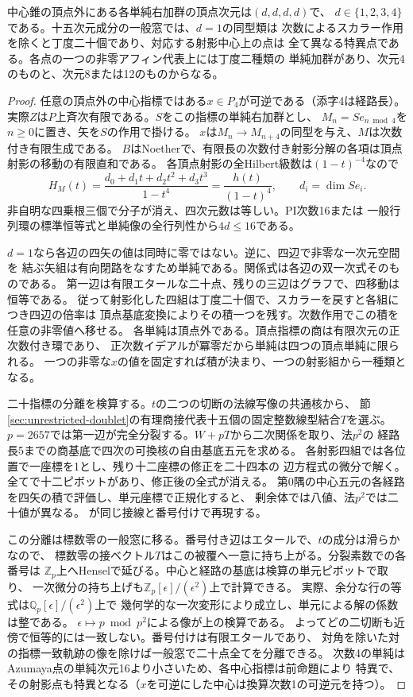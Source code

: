 \begin{theorem}\label{thm:twenty-minimal-characters}
中心錐の頂点外にある各単純右加群の頂点次元は$(d,d,d,d)$で、
$d\in\{1,2,3,4\}$である。十五次元成分の一般窓では、$d=1$の同型類は
次数によるスカラー作用を除くと丁度二十個であり、対応する射影中心上の点は
全て異なる特異点である。各点の一つの非零アフィン代表上には丁度二種類の
単純加群があり、次元4のものと、次元8または12のものからなる。
\end{theorem}
\begin{proof}
任意の頂点外の中心指標ではある$x\in P_4$が可逆である（添字4は経路長）。
実際$Z$は$P$上斉次有限である。$S$をこの指標の単純右加群とし、
$M_n=Se_{n\bmod4}$を$n\ge0$に置き、矢を$S$の作用で掛ける。
$x$は$M_n\to M_{n+4}$の同型を与え、$M$は次数付き有限生成である。
$B$はNoetherで、有限長の次数付き射影分解の各項は頂点射影の移動の有限直和である。
各頂点射影の全Hilbert級数は$(1-t)^{-4}$なので
\[
 H_M(t)=\frac{d_0+d_1t+d_2t^2+d_3t^3}{1-t^4}
       =\frac{h(t)}{(1-t)^4},\qquad d_i=\dim Se_i .
\]
非自明な四乗根三個で分子が消え、四次元数は等しい。PI次数16または
一般行列環の標準恒等式と単純像の全行列性から$4d\le16$である。

$d=1$なら各辺の四矢の値は同時に零ではない。逆に、四辺で非零な一次元空間を
結ぶ矢組は有向閉路をなすため単純である。関係式は各辺の双一次式そのものである。
第一辺は有限エタールな二十点、残りの三辺はグラフで、四移動は恒等である。
従って射影化した四組は丁度二十個で、スカラーを戻すと各組につき四辺の倍率は
頂点基底変換によりその積一つを残す。次数作用でこの積を任意の非零値へ移せる。
各単純は頂点外である。頂点指標の商は有限次元の正次数付き環であり、
正次数イデアルが冪零だから単純は四つの頂点単純に限られる。
一つの非零な$x$の値を固定すれば積が決まり、一つの射影組から一種類となる。

二十指標の分離を検算する。$t$の二つの切断の法線写像の共通核から、
節\ref{sec:unrestricted-doublet}の有理商接代表十五個の固定整数線型結合$T$を選ぶ。
$p=2657$では第一辺が完全分裂する。$W+pT$から二次関係を取り、法$p^2$の
経路長5までの商基底で四次の可換核の自由基底五元を求める。
各射影四組では各位置で一座標を1とし、残り十二座標の修正を二十四本の
辺方程式の微分で解く。全てで十二ピボットがあり、修正後の全式が消える。
第0隅の中心五元の各経路を四矢の積で評価し、単元座標で正規化すると、
剰余体では八値、法$p^2$では二十値が異なる。
が同じ接線と番号付けで再現する。

この分離は標数零の一般窓に移る。番号付き辺はエタールで、$t$の成分は滑らかなので、
標数零の接ベクトル$T$はこの被覆へ一意に持ち上がる。分裂素数での各番号は
$\mathbb Z_p$上へHenselで延びる。中心と経路の基底は検算の単元ピボットで取り、
一次微分の持ち上げも$\mathbb Z_p[\epsilon]/(\epsilon^2)$上で計算できる。
実際、余分な行の等式は$\mathbb Q_p[\epsilon]/(\epsilon^2)$上で
幾何学的な一次変形により成立し、単元による解の係数は整である。
$\epsilon\mapsto p\bmod p^2$による像が上の検算である。
よってどの二切断も近傍で恒等的には一致しない。番号付けは有限エタールであり、
対角を除いた対の指標一致軌跡の像を除けば一般窓で二十点全てを分離できる。
次数4の単純はAzumaya点の単純次元16より小さいため、各中心指標は前命題により
特異で、その射影点も特異となる（$x$を可逆にした中心は換算次数1の可逆元を持つ）。


\end{proof}
